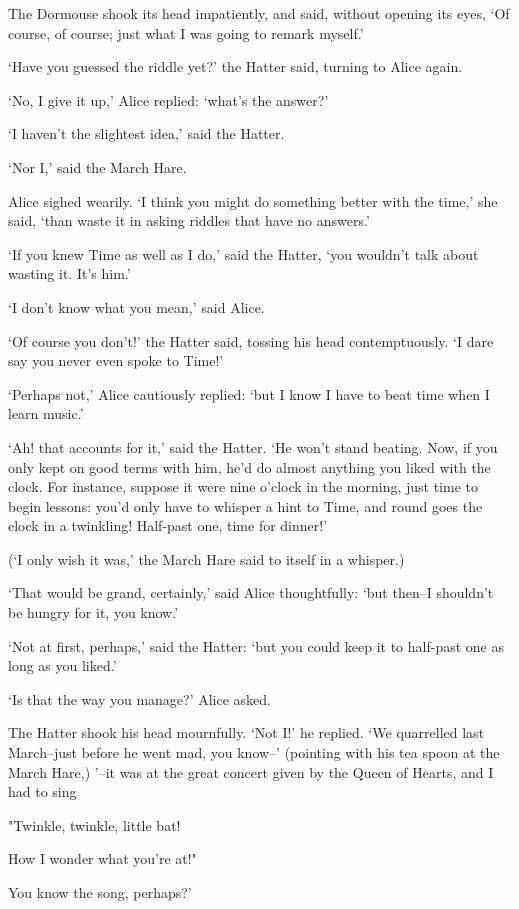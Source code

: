 \documentclass[statementpaper,twoside,openany]{memoir}
\begin{document}
The Dormouse shook its head impatiently, and said, without opening its eyes, `Of course, of course; just what I was going to remark myself.'

`Have you guessed the riddle yet?' the Hatter said, turning to Alice again.

`No, I give it up,' Alice replied: `what's the answer?'

`I haven't the slightest idea,' said the Hatter.

`Nor I,' said the March Hare.

Alice sighed wearily. `I think you might do something better with the time,' she said, `than waste it in asking riddles that have no answers.'

`If you knew Time as well as I do,' said the Hatter, `you wouldn't talk about wasting it. It's him.'

`I don't know what you mean,' said Alice.

`Of course you don't!' the Hatter said, tossing his head contemptuously. `I dare say you never even spoke to Time!'

`Perhaps not,' Alice cautiously replied: `but I know I have to beat time when I learn music.'

`Ah! that accounts for it,' said the Hatter. `He won't stand beating. Now, if you only kept on good terms with him, he'd do almost anything you liked with the clock. For instance, suppose it were nine o'clock in the morning, just time to begin lessons: you'd only have to whisper a hint to Time, and round goes the clock in a twinkling! Half-past one, time for dinner!'

(`I only wish it was,' the March Hare said to itself in a whisper.)

`That would be grand, certainly,' said Alice thoughtfully: `but then--I shouldn't be hungry for it, you know.'

`Not at first, perhaps,' said the Hatter: `but you could keep it to half-past one as long as you liked.'

`Is that the way you manage?' Alice asked.

The Hatter shook his head mournfully. `Not I!' he replied. `We quarrelled last March--just before he went mad, you know--' (pointing with his tea spoon at the March Hare,) '--it was at the great concert given by the Queen of Hearts, and I had to sing

"Twinkle, twinkle, little bat!

How I wonder what you're at!"

You know the song, perhaps?'
\end{document}
